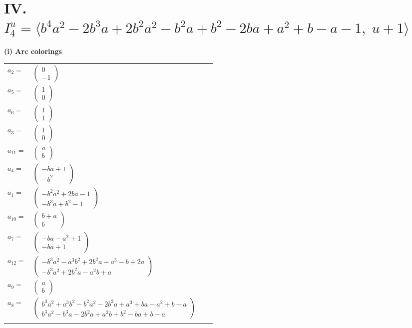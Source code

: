 \documentclass[1p]{elsarticle_modified}
\theoremstyle{definition}
\begin{document}
\centering \section*{IV. $I^u_{4}= \langle b^4 a^2-2 b^3 a+2 b^2 a^2- b^2 a+b^2-2 b a+a^2+b- a-1,\;u+1 \rangle$}
\flushleft \textbf{(i) Arc colorings}\\
\begin{tabular}{m{7pt} m{180pt} m{7pt} m{180pt} }
\flushright $a_{2}=$&$\begin{pmatrix}0\\-1\end{pmatrix}$ \\
\flushright $a_{5}=$&$\begin{pmatrix}1\\0\end{pmatrix}$ \\
\flushright $a_{6}=$&$\begin{pmatrix}1\\1\end{pmatrix}$ \\
\flushright $a_{3}=$&$\begin{pmatrix}1\\0\end{pmatrix}$ \\
\flushright $a_{11}=$&$\begin{pmatrix}a\\b\end{pmatrix}$ \\
\flushright $a_{4}=$&$\begin{pmatrix}- b a+1\\- b^2\end{pmatrix}$ \\
\flushright $a_{1}=$&$\begin{pmatrix}- b^2 a^2+2 b a-1\\- b^3 a+b^2-1\end{pmatrix}$ \\
\flushright $a_{10}=$&$\begin{pmatrix}b+a\\b\end{pmatrix}$ \\
\flushright $a_{7}=$&$\begin{pmatrix}- b a- a^2+1\\- b a+1\end{pmatrix}$ \\
\flushright $a_{12}=$&$\begin{pmatrix}- b^3 a^2- a^3 b^2+2 b^2 a- a^3- b+2 a\\- b^3 a^2+2 b^2 a- a^2 b+a\end{pmatrix}$ \\
\flushright $a_{9}=$&$\begin{pmatrix}a\\b\end{pmatrix}$ \\
\flushright $a_{8}=$&$\begin{pmatrix}b^3 a^2+a^3 b^2- b^2 a^2-2 b^2 a+a^3+b a- a^2+b- a\\b^3 a^2- b^3 a-2 b^2 a+a^2 b+b^2- b a+b- a\end{pmatrix}$\\&\end{tabular}
\end{document}
